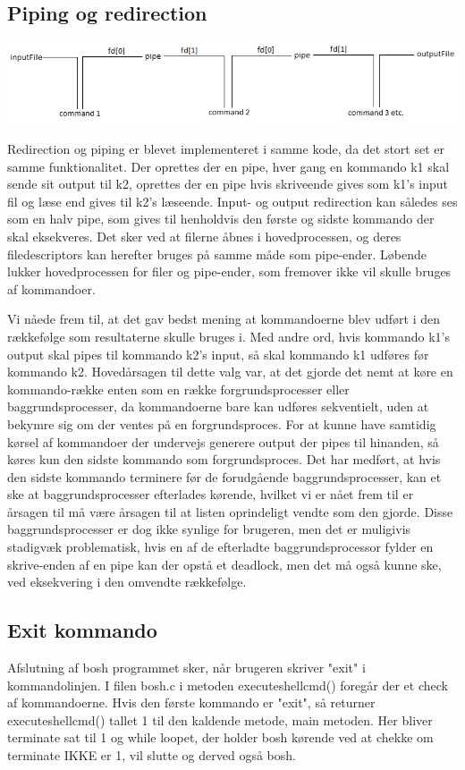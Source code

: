 \subsection{Piping og redirection}
\includegraphics[width=1.1\textwidth]{pipefig}\par\vspace{1cm}
Redirection og piping er blevet implementeret i samme kode, da det stort set er samme funktionalitet.
Der oprettes der en pipe, hver gang en kommando k1 skal sende sit output til k2, oprettes der en pipe hvis skriveende gives som k1's input fil og læse end gives til k2's læseende. Input- og output redirection kan således ses som en halv pipe, som gives til henholdvis den første og sidste kommando der skal eksekveres. Det sker ved at filerne åbnes i hovedprocessen, og deres filedescriptors kan herefter bruges på samme måde som pipe-ender. Løbende lukker hovedprocessen for filer og pipe-ender, som fremover ikke vil skulle bruges af kommandoer.

Vi nåede frem til, at det gav bedst mening at kommandoerne blev udført i den rækkefølge som resultaterne skulle bruges i.
Med andre ord, hvis kommando k1's output skal pipes til kommando k2's input, så skal kommando k1 udføres før kommando k2.
Hovedårsagen til dette valg var, at det gjorde det nemt at køre en kommando-række enten som en række forgrundsprocesser eller baggrundsprocesser, da kommandoerne bare kan udføres sekventielt, uden at bekymre sig om der ventes på en forgrundsproces. For at kunne have samtidig kørsel af kommandoer der undervejs generere output der pipes til hinanden, så køres kun den sidste kommando som forgrundsproces. Det har medført, at hvis den sidste kommando terminere før de forudgående baggrundsprocesser, kan et ske at baggrundsprocesser efterlades kørende, hvilket vi er nået frem til er årsagen til må være årsagen til at listen oprindeligt vendte som den gjorde. Disse baggrundsprocesser er dog ikke synlige for brugeren, men det er muligivis stadigvæk problematisk, hvis en af de efterladte baggrundsprocessor fylder en skrive-enden af en pipe kan der opstå et deadlock, men det må også kunne ske, ved eksekvering i den omvendte rækkefølge.

\subsection{Exit kommando}
Afslutning af bosh programmet sker, når brugeren skriver "exit" i kommandolinjen. I filen bosh.c i metoden executeshellcmd() foregår der et check af kommandoerne. Hvis den første kommando er "exit", så returner executeshellcmd() tallet 1 til den kaldende metode, main metoden. Her bliver terminate sat til 1 og while loopet, der holder bosh kørende ved at chekke om terminate IKKE er 1, vil slutte og derved også bosh.

